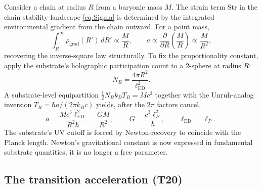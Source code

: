 \documentclass[11pt,a4paper]{article}
\begin{document}
Consider a chain at radius $R$ from a baryonic mass $M$. The strain term $\mathrm{Str}$ in the chain stability landscape \eqref{eq:Sigma} is determined by the integrated environmental gradient from the chain outward. For a point mass,
\begin{equation}
\int_R^\infty \rho_\mathrm{grad}(R')\, dR' \propto \frac{M}{R}, \qquad
a \propto \frac{\partial}{\partial R}\!\left(\frac{M}{R}\right) \propto \frac{M}{R^2},
\end{equation}
recovering the inverse-square law structurally. To fix the proportionality constant, apply the substrate's holographic participation count to a 2-sphere at radius $R$:
\begin{equation}
N_R = \frac{4\pi R^2}{\ell_\mathrm{ED}^2}.
\end{equation}
A substrate-level equipartition $\tfrac{1}{2} N_R k_B T_R = M c^2$ together with the Unruh-analog inversion $T_R = \hbar a / (2\pi k_B c)$ yields, after the $2\pi$ factors cancel,
\begin{equation}
a = \frac{M c^3 \ell_\mathrm{ED}^2}{R^2 \hbar} = \frac{GM}{R^2}, \qquad
\boxed{\; G = \frac{c^3 \ell_P^2}{\hbar}, \qquad \ell_\mathrm{ED} = \ell_P. \;}
\end{equation}
The substrate's UV cutoff is forced by Newton-recovery to coincide with the Planck length. Newton's gravitational constant is now expressed in fundamental substrate quantities; it is no longer a free parameter.

\subsection{The transition acceleration (T20)}
\end{document}
